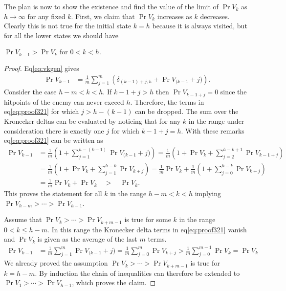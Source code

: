 The plan is now to show the existence and find the value of the limit of $\Pr{V_k}$ as $h \rightarrow \infty$ for any fixed $k$. First, we claim that $\Pr{V_k}$ increases as $k$ decreases. Clearly this is not true for the initial state $k=h$ because it is always visited, but for all the lower states we should have
\begin{claim}\label{claim:vkhinc}
    $\Pr{V_{k-1}} > \Pr{V_k}$ \quad for $0 < k < h$.
\end{claim}
\begin{proof}
Eq\ref{eq:vkgen} gives
\begin{align}
    \Pr{V_{k-1}} &= \frac{1}{m}\sum_{j=1}^m \left(\delta_{(k-1)+j,h} + \Pr{V_{(k-1}+j})\right)\label{eq:proof321}.
\end{align}
Consider the case $h - m < k < h$. If $k-1+j > h$ then $\Pr{V_{k-1+j}} = 0$ since the hitpoints of the enemy can never exceed $h$. Therefore, the terms in eq\ref{eq:proof321} for which $j>h-(k-1)$ can be dropped.
The sum over the Kronecker deltas can be evaluated by noticing that for any $k$ in the range under consideration there is exactly one $j$ for which $k-1+j = h$. With these remarks eq\ref{eq:proof321} can be written as
\begin{align}
    \Pr{V_{k-1}} &= \frac{1}{m}\left(1 + \sum_{j=1}^{h-(k-1)}\Pr{V_{(k-1}+j})\right)
    = \frac{1}{m}\left(1 + \Pr{V_{k}} + \sum_{j=2}^{h-k+1}\Pr{V_{k-1+j}}\right)\nonumber\\
              &= \frac{1}{m}\left(1 + \Pr{V_{k}} + \sum_{j=1}^{h-k}\Pr{V_{k+j}}\right)\nonumber
              = \frac{1}{m}\Pr{V_{k}} + \frac{1}{m}\left(1 + \sum_{j=0}^{h-k}\Pr{V_{k+j}}\right)\\
              &= \frac{1}{m}\Pr{V_{k}} + \Pr{V_{k}} \quad > \quad \Pr{V_{k}}.\label{eq:proof323}
\end{align}
This proves the statement for all $k$ in the range $h-m<k<h$ implying $\Pr{V_{h-m}} > \cdots > \Pr{V_{h-1}}$.

Assume that $\Pr{V_{k}} >\cdots> \Pr{V_{k+m-1}}$ is true for some $k$ in the range $0 < k \leq h-m$. In this range the Kronecker delta terms in eq\ref{eq:proof321} vanish and $\Pr{V_{k}}$ is given as the average of the last $m$ terms.
\begin{align}
    \Pr{V_{k-1}} &= \frac{1}{m}\sum_{j=1}^m \Pr{V_{(k-1}+j})
               = \frac{1}{m}\sum_{j=0}^m \Pr{V_{k+j}}
               > \frac{1}{m}\sum_{j=0}^{m-1} \Pr{V_{k}} = \Pr{V_{k}}
\end{align}
We already proved the assumption $\Pr{V_{k}} >\cdots> \Pr{V_{k+m-1}}$ is true for $k=h-m$. By induction the chain of inequalities can therefore be extended to $\Pr{V_{1}} > \cdots > \Pr{V_{h-1}}$, which proves the claim.
\end{proof}
